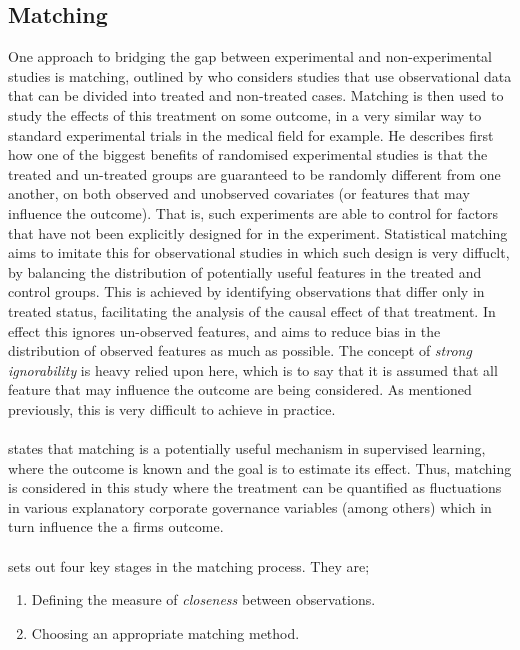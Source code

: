 \subsection{Matching}\label{matching}
{One approach to bridging the gap between experimental and non-experimental studies is matching, outlined by \cite{stuart2010matching} who considers studies that use observational data that can be divided into treated and non-treated cases. Matching is then used to study the effects of this treatment on some outcome, in a very similar way to standard experimental trials in the medical field for example. He describes first how one of the biggest benefits of randomised experimental studies is that the treated and un-treated groups are guaranteed to be randomly different from one another, on both observed and unobserved covariates (or features that may influence the outcome). That is, such experiments are able to control for factors that have not been explicitly designed for in the experiment. Statistical matching aims to imitate this for observational studies in which such design is very diffuclt, by balancing the distribution of potentially useful features in the treated and control groups. This is achieved by identifying observations that differ only in treated status, facilitating the analysis of the causal effect of that treatment. In effect this ignores un-observed features, and aims to reduce bias in the distribution of observed features as much as possible. The concept of {\it strong ignorability} is heavy relied upon here, which is to say that it is assumed that all feature that may influence the outcome are being considered. As mentioned previously, this is very difficult to achieve in practice. \\\\
\cite {stuart2010matching} states that matching is a potentially useful mechanism in supervised learning, where the outcome is known and the goal is to estimate its effect. Thus, matching is considered in this study where the treatment can be quantified as fluctuations in various explanatory corporate governance variables (among others) which in turn influence the a firms outcome. \\\\
\cite {stuart2010matching} sets out four key stages in the matching process. They are;
\begin {enumerate}
\item{Defining the measure of {\it closeness} between observations.}
\item{Choosing an appropriate matching method.}

\end{enumerate}}
